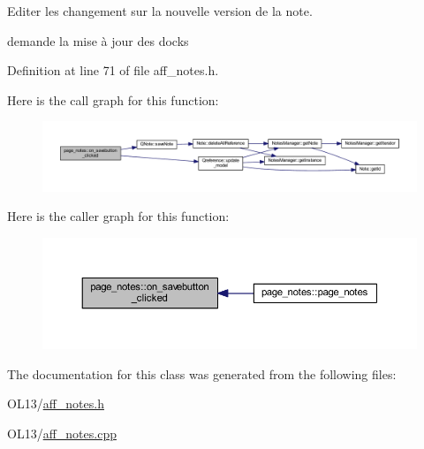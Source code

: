 Editer les changement sur la nouvelle version de la note. 

demande la mise à jour des docks 

Definition at line 71 of file aff\+\_\+notes.\+h.

Here is the call graph for this function\+:\nopagebreak
\begin{figure}[H]
\begin{center}
\leavevmode
\includegraphics[width=350pt]{classpage__notes_a3810696feb56abdad663cb7ae4b2f1b0_cgraph}
\end{center}
\end{figure}
Here is the caller graph for this function\+:\nopagebreak
\begin{figure}[H]
\begin{center}
\leavevmode
\includegraphics[width=350pt]{classpage__notes_a3810696feb56abdad663cb7ae4b2f1b0_icgraph}
\end{center}
\end{figure}


The documentation for this class was generated from the following files\+:\begin{DoxyCompactItemize}
\item 
O\+L13/\hyperlink{aff__notes_8h}{aff\+\_\+notes.\+h}\item 
O\+L13/\hyperlink{aff__notes_8cpp}{aff\+\_\+notes.\+cpp}\end{DoxyCompactItemize}

